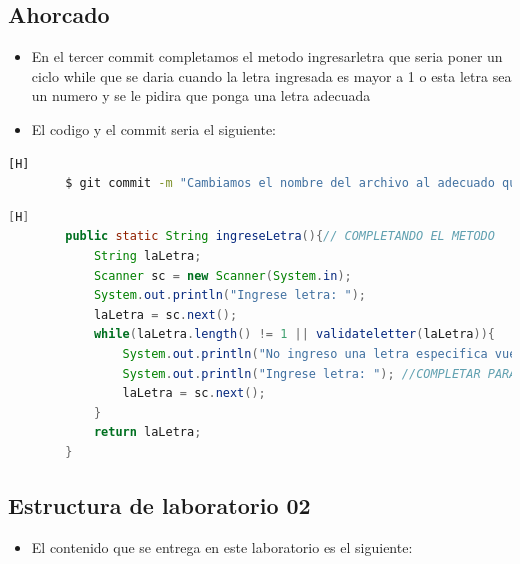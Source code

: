 \documentclass{article}
\begin{document}
	\subsection{Ahorcado}
	\begin{itemize}	
		\item En el tercer commit completamos el metodo ingresarletra que seria poner un ciclo while que se daria cuando la letra ingresada es mayor a 1 o esta letra sea un numero y se le pidira que ponga una letra adecuada
		\item El codigo y el commit seria el siguiente:
	\end{itemize}
	\begin{lstlisting}[language=bash,caption={Commit}][H]
		$ git commit -m "Cambiamos el nombre del archivo al adecuado que es Ahorcado y tamien anadimos un metodo validateletter y completamos el metodo ingreseletra"
	\end{lstlisting}
	\begin{lstlisting}[language=java,caption={Las lineas de codigo del completado:}][H]
		public static String ingreseLetra(){// COMPLETANDO EL METODO
			String laLetra;
			Scanner sc = new Scanner(System.in);
			System.out.println("Ingrese letra: ");
			laLetra = sc.next();
			while(laLetra.length() != 1 || validateletter(laLetra)){
				System.out.println("No ingreso una letra especifica vuelva a ingresar una letra");
				System.out.println("Ingrese letra: "); //COMPLETAR PARA VALIDAR 
				laLetra = sc.next();
			}
			return laLetra;
		}
	\end{lstlisting}
	\subsection{Estructura de laboratorio 02}
	\begin{itemize}	
		\item El contenido que se entrega en este laboratorio es el siguiente:
	\end{itemize}
\end{document}
